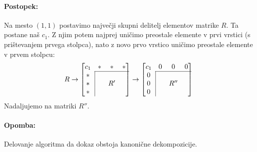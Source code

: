 \paragraph{Postopek:}
Na mesto $(1,1)$ postavimo najve\v cji skupni delitelj elementov matrike $R$. Ta postane na\v s $c_1$. Z njim potem najprej uni\v cimo
preostale elemente v prvi vrstici (s pri\v stevanjem prvega stolpca), nato z novo prvo vrstico uni\v cimo preostale elemente v
prvem stolpcu:
\[
	R \to
	\begin{bmatrix}
		c_1 & * & *  & * \\
		\cline{2-4}
		 * &\hspace{-3.2ex}\vline   &    &   \\
		 * &\hspace{-3.2ex}\vline   & R' &  \\
		 * &\hspace{-3.2ex}\vline   &    &
	\end{bmatrix} \to
	\begin{bmatrix}
		c_1 & 0 & 0  & 0 \\
		\cline{2-4}
		 0 &\hspace{-3.2ex}\vline   &    &   \\
		 0 &\hspace{-3.2ex}\vline   & R'' &  \\
		 0 &\hspace{-3.2ex}\vline   &    &
	\end{bmatrix}
\]
Nadaljujemo na matriki $R''$.
\paragraph{Opomba:} Delovanje algoritma da dokaz obstoja kanoni\v cne dekompozicije.

